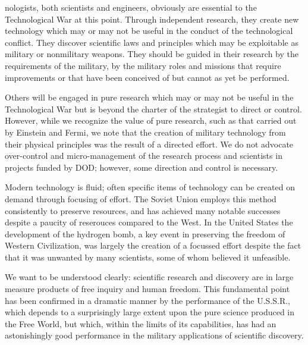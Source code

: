 nologists, both scientists and engineers, obviously are essential to the Technological War at this point. Through independent research, they create new technology which may or may not be useful in the conduct of the technological conflict. They discover scientific laws and principles which may be exploitable as military or nonmilitary weapons. They should be guided in their research by the requirements of the military, by the military roles and missions that require improvements or that have been conceived of but cannot as yet be performed.

Others will be engaged in pure research which may or may not be useful in the Technological War but is beyond the charter of the strategist to direct or control. However, while we recognize the value of pure research, such as that carried out by Einstein and Fermi, we note that the creation of military technology from their physical principles was the result of a directed effort. We do not advocate over-control and micro-management of the research process and scientists in projects funded by DOD; however, some direction and control is necessary.

Modern technology is fluid; often specific items of technology can be created on demand through focusing of effort. The Soviet Union employs this method consistently to preserve resources, and has achieved many notable successes despite a paucity of reserouces compared to the West. In the United States the development of the hydrogen bomb, a key event in preserving the freedom of Western Civilization, was largely the creation of a focussed effort despite the fact that it was unwanted by many scientists, some of whom believed it unfeasible.

We want to be understood clearly: scientific research and discovery are in large measure products of free inquiry and human freedom. This fundamental point has been confirmed in a dramatic manner by the performance of the U.S.S.R., which depends to a surprisingly large extent upon the pure science produced in the Free World, but which, within the limits of its capabilities, has had an astonishingly good performance in the military applications of scientific discovery.

